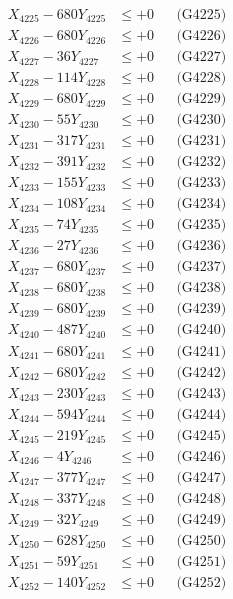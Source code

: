 \documentclass[a4paper,10pt]{article}
\begin{document}
{\begin{align}
X_{4225} - 680Y_{4225} &\leq +0 && \text{(G4225)} \\
X_{4226} - 680Y_{4226} &\leq +0 && \text{(G4226)} \\
X_{4227} - 36Y_{4227} &\leq +0 && \text{(G4227)} \\
X_{4228} - 114Y_{4228} &\leq +0 && \text{(G4228)} \\
X_{4229} - 680Y_{4229} &\leq +0 && \text{(G4229)} \\
X_{4230} - 55Y_{4230} &\leq +0 && \text{(G4230)} \\
\allowbreak
X_{4231} - 317Y_{4231} &\leq +0 && \text{(G4231)} \\
X_{4232} - 391Y_{4232} &\leq +0 && \text{(G4232)} \\
X_{4233} - 155Y_{4233} &\leq +0 && \text{(G4233)} \\
X_{4234} - 108Y_{4234} &\leq +0 && \text{(G4234)} \\
X_{4235} - 74Y_{4235} &\leq +0 && \text{(G4235)} \\
X_{4236} - 27Y_{4236} &\leq +0 && \text{(G4236)} \\
X_{4237} - 680Y_{4237} &\leq +0 && \text{(G4237)} \\
X_{4238} - 680Y_{4238} &\leq +0 && \text{(G4238)} \\
X_{4239} - 680Y_{4239} &\leq +0 && \text{(G4239)} \\
X_{4240} - 487Y_{4240} &\leq +0 && \text{(G4240)} \\
\allowbreak
X_{4241} - 680Y_{4241} &\leq +0 && \text{(G4241)} \\
X_{4242} - 680Y_{4242} &\leq +0 && \text{(G4242)} \\
X_{4243} - 230Y_{4243} &\leq +0 && \text{(G4243)} \\
X_{4244} - 594Y_{4244} &\leq +0 && \text{(G4244)} \\
X_{4245} - 219Y_{4245} &\leq +0 && \text{(G4245)} \\
X_{4246} - 4Y_{4246} &\leq +0 && \text{(G4246)} \\
X_{4247} - 377Y_{4247} &\leq +0 && \text{(G4247)} \\
X_{4248} - 337Y_{4248} &\leq +0 && \text{(G4248)} \\
X_{4249} - 32Y_{4249} &\leq +0 && \text{(G4249)} \\
X_{4250} - 628Y_{4250} &\leq +0 && \text{(G4250)} \\
\allowbreak
X_{4251} - 59Y_{4251} &\leq +0 && \text{(G4251)} \\
X_{4252} - 140Y_{4252} &\leq +0 && \text{(G4252)} \\

\end{align}}
\end{document}
